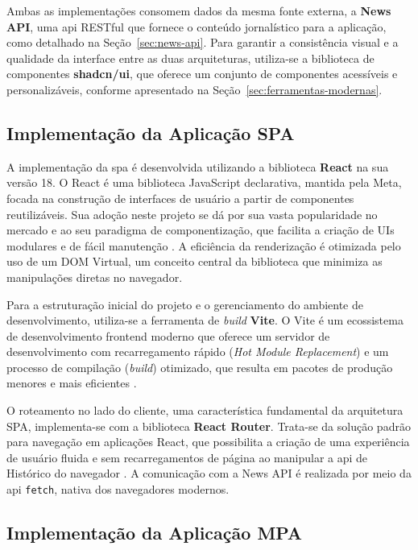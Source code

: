 Ambas as implementações consomem dados da mesma fonte externa, a \textbf{News API}, uma \acrshort{api} RESTful que fornece o conteúdo jornalístico para a aplicação, como detalhado na Seção~\ref{sec:news-api}. Para garantir a consistência visual e a qualidade da interface entre as duas arquiteturas, utiliza-se a biblioteca de componentes \textbf{shadcn/ui}, que oferece um conjunto de componentes acessíveis e personalizáveis, conforme apresentado na Seção~\ref{sec:ferramentas-modernas}.

\subsection{Implementação da Aplicação SPA}
\label{ssec:implementacao_spa}

A implementação da \acrfull{spa} é desenvolvida utilizando a biblioteca \textbf{React} na sua versão 18. O React é uma biblioteca JavaScript declarativa, mantida pela Meta, focada na construção de interfaces de usuário a partir de componentes reutilizáveis. Sua adoção neste projeto se dá por sua vasta popularidade no mercado e ao seu paradigma de componentização, que facilita a criação de UIs modulares e de fácil manutenção \cite{react2025}. A eficiência da renderização é otimizada pelo uso de um DOM Virtual, um conceito central da biblioteca que minimiza as manipulações diretas no navegador.

Para a estruturação inicial do projeto e o gerenciamento do ambiente de desenvolvimento, utiliza-se a ferramenta de \textit{build} \textbf{Vite}. O Vite é um ecossistema de desenvolvimento frontend moderno que oferece um servidor de desenvolvimento com recarregamento rápido (\textit{Hot Module Replacement}) e um processo de compilação (\textit{build}) otimizado, que resulta em pacotes de produção menores e mais eficientes \cite{vite_docs}.

O roteamento no lado do cliente, uma característica fundamental da arquitetura SPA, implementa-se com a biblioteca \textbf{React Router}. Trata-se da solução padrão para navegação em aplicações React, que possibilita a criação de uma experiência de usuário fluida e sem recarregamentos de página ao manipular a \acrshort{api} de Histórico do navegador \cite{react_router_docs}. A comunicação com a News API é realizada por meio da \acrshort{api} \texttt{fetch}, nativa dos navegadores modernos.

\subsection{Implementação da Aplicação MPA}
\label{ssec:implementacao_mpa}

